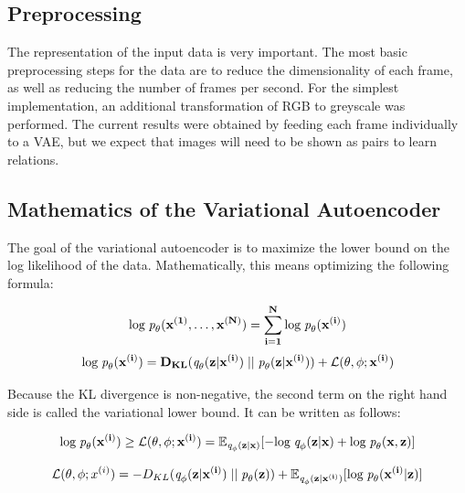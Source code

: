 \documentclass{article}
\begin{document}
\subsection*{Preprocessing}
The representation of the input data is very important. The most basic
preprocessing steps for the data are to reduce the dimensionality of each
frame, as well as reducing the number of frames per second. For the simplest
implementation, an additional transformation of RGB to greyscale was performed.
The current results were obtained by feeding each frame individually to a
VAE, but we expect that images will need to be shown as pairs to learn
relations.

\subsection*{Mathematics of the Variational Autoencoder}
The goal of the variational autoencoder is to maximize the lower bound on the
log likelihood of the data. Mathematically, this means optimizing the following
formula:

\begin{equation} \label{eq1}
    \text{log}\;\emph{p}_\theta(\bf{x}^{(1)}, \ldots, \bf{x}^{(N)}) = \sum^{N}_{i=1} \text{log}\; \emph{p}_\theta(\bf{x}^{(i)})\\
\end{equation}
\begin{equation} \label{eq2}
    \text{log}\; \emph{p}_\theta(\bf{x}^{(i)}) = D_{KL}(\emph{q}_\theta(\bf{z|x^{(i)}})\;||\;\emph{p}_\theta(\bf{z|x^{(i)}})) + \mathcal{L}(\theta, \phi; x^{(i)})\\
\end{equation}

Because the KL divergence is non-negative, the second term on the right hand
side is called the variational lower bound. It can be written as follows:

\begin{equation} \label{eq3}
    \text{log}\; \emph{p}_\theta(\bf{x}^{(i)}) \geq \mathcal{L}(\theta, \phi; x^{(i)})\\ = \mathbb{E}_{\emph{q}_{\phi}(\bf{z|x})}[-\text{log}\;\emph{q}_\phi(\bf{z|x}) + \text{log}\;\emph{p}_\theta(\bf{x, z})]
\end{equation}

\begin{equation} \label{eq4}
    \mathcal{L}(\theta, \phi; x^{(i)})\\ = -D_{KL}(\emph{q}_\phi(\bf{z|x^{(i)}})\;||\;\emph{p}_\theta(\bf{z})) + \mathbb{E}_{\emph{q}_\phi(\bf{z|x^{(i)}})}[\text{log}\;\emph{p}_\theta(\bf{x^{(i)}|z})]
\end{equation}
\end{document}

